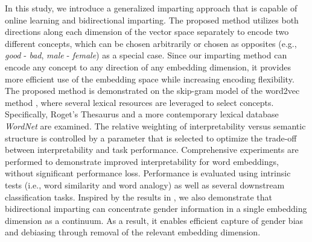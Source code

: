 \documentclass[11pt,a4paper]{article}
\begin{document}
In this study, we introduce a generalized imparting approach that is capable of online learning and bidirectional imparting. The proposed method utilizes both directions along each dimension of the vector space separately to encode two different concepts, which can be chosen arbitrarily or chosen as opposites (e.g., \textit{good} - \textit{bad}, \textit{male} - \textit{female}) as a special case. Since our imparting method can encode any concept to any direction of any embedding dimension, it provides more efficient use of the embedding space while increasing encoding flexibility. The proposed method is demonstrated on the skip-gram model of the word2vec method \citep{mikolov13word2vec_a,mikolov13word2vec_b}, where several lexical resources are leveraged to select concepts. Specifically, Roget's Thesaurus and a more contemporary lexical database \textit{WordNet} are examined. The relative weighting of interpretability versus semantic structure is controlled by a parameter that is selected to optimize the trade-off between interpretability and task performance. Comprehensive experiments are performed to demonstrate improved interpretability for word embeddings, without significant performance loss. Performance is evaluated using intrinsic tests (i.e., word similarity and word analogy) as well as several downstream classification tasks. Inspired by the results in \citep{bolukbasi16debiasing}, we also demonstrate that bidirectional imparting can concentrate gender information in a single embedding dimension as a continuum. As a result, it enables efficient capture of gender bias and debiasing through removal of the relevant embedding dimension. 



\end{document}
